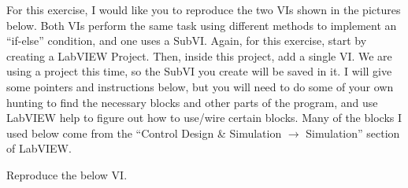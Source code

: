 \documentclass[11pt]{article}
\begin{document}
\MakeAssignmentTitle

\Ex

For this exercise, I would like you to reproduce the two VIs shown in the pictures below. Both VIs perform the same task using different methods to implement an “if-else” condition, and one uses a SubVI. Again, for this exercise, start by creating a LabVIEW Project. Then, inside this project, add a single VI. We are using a project this time, so the SubVI you create will be saved in it. I will give some pointers and instructions below, but you will need to do some of your own hunting to find the necessary blocks and other parts of the program, and use LabVIEW help to figure out how to use/wire certain blocks. Many of the blocks I used below come from the “Control Design \& Simulation $\rightarrow$ Simulation” section of LabVIEW.

Reproduce the below VI.
\end{document}
